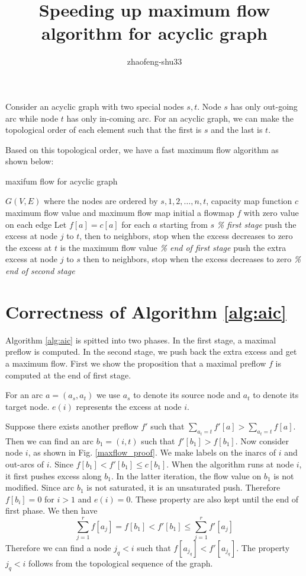 \documentclass{article}
\title{Speeding up maximum flow algorithm for acyclic graph}
\author{zhaofeng-shu33}
\theoremstyle{definition}
\begin{document}
\maketitle
Consider an acyclic graph with two special nodes $s, t$. Node $s$ has only out-going arc while node $t$ has only in-coming arc.
For an acyclic graph, we can make the topological order of each element such that the first is $s$ and the last is $t$.

Based on this topological order, we have a fast maximum flow algorithm as shown below:
\begin{algorithm}
\caption{maxifum flow for acyclic graph}\label{alg:aic}
	\begin{algorithmic}[1]
		\REQUIRE $G(V,E)$ where the nodes are ordered by $s, 1, 2, \dots, n, t$, capacity map function $c$
		\ENSURE maximum flow value and maximum flow map
		\STATE initial a flowmap $f$ with zero value on each edge
		\STATE Let $f[a] = c[a]$ for each $a$ starting from $s$  \textit{\% first stage}
			\STATE push the excess at node $j$ to $t$, then to neighbors, stop when the excess decreases to zero
		\ENDFOR
	      \STATE the excess at $t$ is the maximum flow value \textit{\% end of first stage}
			\STATE push the extra excess at node $j$ to $s$ then to neighbors, stop when the excess decreases to zero
		\ENDFOR  \textit{\% end of second stage}
           
	\end{algorithmic}
\end{algorithm}
\section{Correctness of Algorithm \ref{alg:aic}}
Algorithm \ref{alg:aic} is spitted into two phases. In the first stage, a maximal preflow is computed. In the second stage, we push back the extra excess and get a maximum flow.  
First we show the proposition that a maximal preflow $f$ is computed at the end of first stage.

For an arc $a = (a_s, a_t)$ we use $a_s$ to denote its source node and $a_t$ to denote its target node. $e(i)$ represents the excess at node $i$.

Suppose there exists another preflow $f'$ such that $\sum_{a_t = t} f'[a] > \sum_{a_t =t} f[a]$. Then we can find an arc $b_1 = (i, t)$ such that $f'[b_1] > f[b_1]$. Now consider node $i$, as shown in Fig. \ref{maxflow_proof}. We make labels on the inarcs of $i$ and out-arcs of $i$.
Since $f[b_1] < f'[b_1] \leq c[b_1]$. When the algorithm runs at node $i$, it first pushes excess along $b_1$. In the latter iteration, the flow value on $b_1$ is not modified. Since arc $b_1$ is not saturated, it is an unsaturated push. Therefore $f[b_i] = 0$ for $i>1$ and $e(i) = 0$. These property are also kept until the end of first phase.  We then have
\begin{equation}
\sum_{j=1}^r f[a_j] = f[b_1] < f'[b_1] \leq \sum_{j=1}^r f'[a_j]
\end{equation}
Therefore we can find a node $j_q<i$ such that $f[a_{j_q}] < f'[a_{j_q}]$. The property ${j_q}<i$ follows from the topological sequence of the graph.
\end{document}
